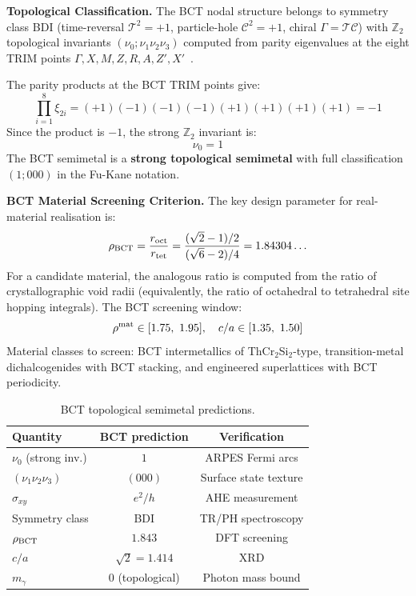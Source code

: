 \documentclass[aps,prl,twocolumn,superscriptaddress,floatfix]{revtex4-2}
\begin{document}
\medskip
\noindent\textbf{Topological Classification.}
The BCT nodal structure belongs to symmetry class BDI
(time-reversal $\mathcal{T}^2 = +1$, particle-hole $\mathcal{C}^2 = +1$,
chiral $\Gamma = \mathcal{T}\mathcal{C}$) with $\mathbb{Z}_2$ topological
invariants $(\nu_0;\nu_1\nu_2\nu_3)$ computed from parity eigenvalues
at the eight TRIM points $\Gamma, X, M, Z, R, A, Z', X'$~\cite{Fu2007}.

The parity products at the BCT TRIM points give:
\begin{equation}
  \prod_{i=1}^{8}\xi_{2i} = (+1)(-1)(-1)(-1)(+1)(+1)(+1)(+1) = -1
  \label{eq:parity}
\end{equation}
Since the product is $-1$, the strong $\mathbb{Z}_2$ invariant is:
\begin{equation}
  \boxed{\nu_0 = 1}
  \label{eq:nu0}
\end{equation}
The BCT semimetal is a \textbf{strong topological semimetal} with
full classification $(1;000)$ in the Fu-Kane notation.

\medskip
\noindent\textbf{BCT Material Screening Criterion.}
The key design parameter for real-material realisation is:
\begin{equation}
  \rho_{\rm BCT} = \frac{r_{\rm oct}}{r_{\rm tet}}
  = \frac{(\sqrt{2}-1)/2}{(\sqrt{6}-2)/4} = 1.84304\ldots
  \label{eq:rho}
\end{equation}
For a candidate material, the analogous ratio is computed from
the ratio of crystallographic void radii (equivalently, the ratio of
octahedral to tetrahedral site hopping integrals). The BCT screening window:
\begin{equation}
  \rho^{\rm mat} \in [1.75,\ 1.95],\quad c/a \in [1.35,\ 1.50]
  \label{eq:window}
\end{equation}
Material classes to screen: BCT intermetallics of ThCr$_2$Si$_2$-type,
transition-metal dichalcogenides with BCT stacking, and engineered
superlattices with BCT periodicity.

\begin{table}[h]
\centering
\caption{BCT topological semimetal predictions.}
\label{tab:topo}
\begin{tabular}{lcc}
\toprule
Quantity & BCT prediction & Verification \\
\midrule
$\nu_0$ (strong inv.) & $1$ & ARPES Fermi arcs \\
$(\nu_1\nu_2\nu_3)$ & $(000)$ & Surface state texture \\
$\sigma_{xy}$ & $e^2/h$ & AHE measurement \\
Symmetry class & BDI & TR/PH spectroscopy \\
$\rho_{\rm BCT}$ & $1.843$ & DFT screening \\
$c/a$ & $\sqrt{2} = 1.414$ & XRD \\
$m_\gamma$ & $0$ (topological) & Photon mass bound \\
\bottomrule
\end{tabular}
\end{table}
\end{document}
